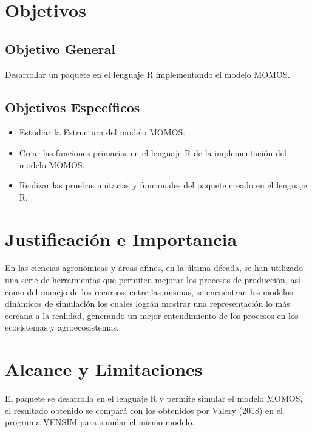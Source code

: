 \section{Objetivos}

\subsection{Objetivo General}
Desarrollar un paquete en el lenguaje R implementando el modelo MOMOS.


\subsection{Objetivos Espec\'ificos}

\begin{itemize}
\item Estudiar la Estructura del modelo MOMOS.
\item Crear las funciones primarias en el lenguaje R de la implementaci\'on del modelo MOMOS.
\item Realizar las pruebas unitarias y funcionales del paquete creado en el lenguaje R.
\end{itemize}

\section{Justificaci\'on e Importancia}

En las ciencias agron\'omicas y \'areas afines, en la \'ultima d\'ecada, se han utilizado una serie de herramientas que permiten mejorar los procesos de producci\'on, así como del manejo de los recursos, entre las mismas, se encuentran los modelos din\'amicos de simulaci\'on los cuales logr\'an mostrar una representaci\'on lo m\'as cercana a la realidad, generando un mejor entendimiento de los procesos en los ecosistemas y agroecosistemas. \\

\section{Alcance y Limitaciones}

El paquete se desarrolla en el lenguaje R y permite simular el modelo MOMOS, el resultado obtenido se compar\'a con los obtenidos por Valery (2018) en el programa VENSIM para simular el mismo modelo. \\
